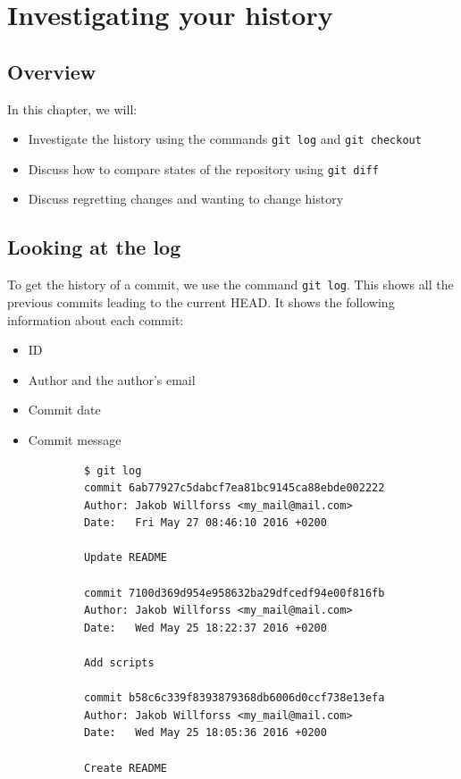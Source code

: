\documentclass[../main/git_course_main.tex]{subfiles}
\begin{document}
	
	\setcounter{chapter}{2}
	\chapter{Investigating your history}
	
	\section{Overview}
	
	In this chapter, we will:
	
	\begin{itemize}
		\item Investigate the history using the commands \verb$git log$ and \verb$git checkout$
		\item Discuss how to compare states of the repository using \verb$git diff$
		\item Discuss regretting changes and wanting to change history
	\end{itemize}
	
	\section{Looking at the log}
	
	To get the history of a commit, we use the command \verb$git log$. This shows all the previous commits leading to the current HEAD. It shows the following information about each commit:
	
	
	\begin{itemize}
		\item ID
		\item Author and the author's email
		\item Commit date
		\item Commit message
	\end{itemize}
	
	\begin{codebox}
		\begin{lstlisting}
			$ git log
			commit 6ab77927c5dabcf7ea81bc9145ca88ebde002222
			Author: Jakob Willforss <my_mail@mail.com>
			Date:   Fri May 27 08:46:10 2016 +0200
			
			Update README
			
			commit 7100d369d954e958632ba29dfcedf94e00f816fb
			Author: Jakob Willforss <my_mail@mail.com>
			Date:   Wed May 25 18:22:37 2016 +0200
			
			Add scripts
			
			commit b58c6c339f8393879368db6006d0ccf738e13efa
			Author: Jakob Willforss <my_mail@mail.com>
			Date:   Wed May 25 18:05:36 2016 +0200
			
			Create README
		\end{lstlisting}
	\end{codebox}
	
\end{document}
